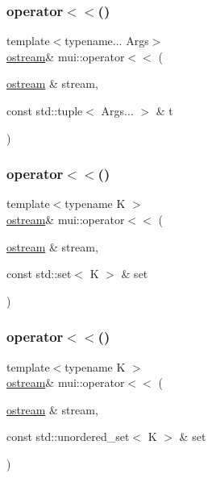 \mbox{\label{namespacemui_ac718570df36d184bd1a15a61eade424e}} 
\subsubsection{\texorpdfstring{operator$<$$<$()}{operator<<()}\hspace{0.1cm}{\footnotesize\ttfamily [11/21]}}
{\footnotesize\ttfamily template$<$typename... Args$>$ \\
\hyperlink{classmui_1_1ostream}{ostream}\& mui\+::operator$<$$<$ (\begin{DoxyParamCaption}\item[{\hyperlink{classmui_1_1ostream}{ostream} \&}]{stream,  }\item[{const std\+::tuple$<$ Args... $>$ \&}]{t }\end{DoxyParamCaption})\hspace{0.3cm}{\ttfamily [inline]}}

\mbox{\label{namespacemui_aa039195d937aaf19f0b342a210452567}} 
\subsubsection{\texorpdfstring{operator$<$$<$()}{operator<<()}\hspace{0.1cm}{\footnotesize\ttfamily [12/21]}}
{\footnotesize\ttfamily template$<$typename K $>$ \\
\hyperlink{classmui_1_1ostream}{ostream}\& mui\+::operator$<$$<$ (\begin{DoxyParamCaption}\item[{\hyperlink{classmui_1_1ostream}{ostream} \&}]{stream,  }\item[{const std\+::set$<$ K $>$ \&}]{set }\end{DoxyParamCaption})\hspace{0.3cm}{\ttfamily [inline]}}

\mbox{\label{namespacemui_a0d6169e01cb142902dfffa692610c49c}} 
\subsubsection{\texorpdfstring{operator$<$$<$()}{operator<<()}\hspace{0.1cm}{\footnotesize\ttfamily [13/21]}}
{\footnotesize\ttfamily template$<$typename K $>$ \\
\hyperlink{classmui_1_1ostream}{ostream}\& mui\+::operator$<$$<$ (\begin{DoxyParamCaption}\item[{\hyperlink{classmui_1_1ostream}{ostream} \&}]{stream,  }\item[{const std\+::unordered\+\_\+set$<$ K $>$ \&}]{set }\end{DoxyParamCaption})\hspace{0.3cm}{\ttfamily [inline]}}

